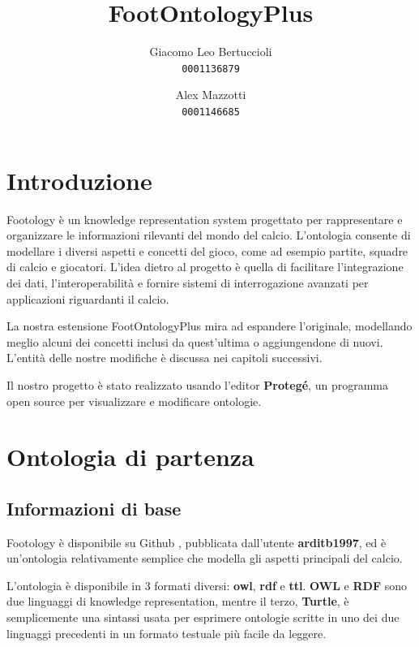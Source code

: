 \documentclass[11pt]{report} %
\title{FootOntologyPlus}
\author{
  Giacomo Leo Bertuccioli\\
  \texttt{0001136879}
  \and
  Alex Mazzotti\\
  \texttt{0001146685}
}
\date{} %
\begin{document}
\maketitle

\newpage

\renewcommand*\contentsname{Indice}

\tableofcontents
\newpage

\chapter{Introduzione}

Footology \cite{foot} è un knowledge representation system progettato per rappresentare e organizzare le informazioni rilevanti del mondo del calcio.
L'ontologia consente di modellare i diversi aspetti e concetti del gioco, come ad esempio partite, squadre di calcio e giocatori.
L'idea dietro al progetto è quella di facilitare l'integrazione dei dati, l'interoperabilità e fornire sistemi di interrogazione avanzati per applicazioni riguardanti il calcio.

\hfill

La nostra estensione FootOntologyPlus mira ad espandere l'originale, modellando meglio alcuni dei concetti inclusi da quest'ultima o aggiungendone di nuovi.
L'entità delle nostre modifiche è discussa nei capitoli successivi.

\hfill

Il nostro progetto è stato realizzato usando l'editor \textbf{Protegé}, un programma open source per visualizzare e modificare ontologie.

\chapter{Ontologia di partenza}

\section{Informazioni di base}

Footology è disponibile su Github \cite{foot}, pubblicata dall'utente \textbf{arditb1997}, ed è un'ontologia relativamente semplice che modella gli aspetti principali del calcio.

\hfill

L'ontologia è disponibile in 3 formati diversi: \textbf{owl}, \textbf{rdf} e \textbf{ttl}.
\textbf{OWL} e \textbf{RDF} sono due linguaggi di knowledge representation, mentre il terzo, \textbf{Turtle}, è semplicemente una sintassi usata per esprimere ontologie scritte in uno dei due linguaggi precedenti in un formato testuale più facile da leggere. 
\end{document}
